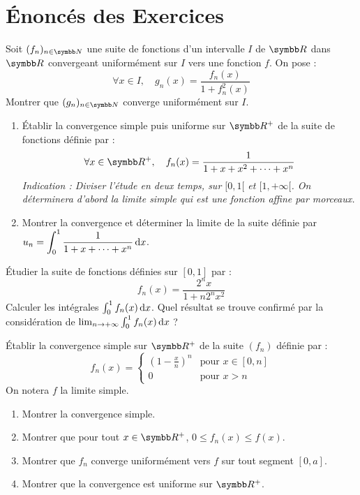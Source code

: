 

\section{Énoncés des Exercices}

\begin{exercice}
Soit $(f_n)_{n\in\N}$ une suite de fonctions d'un intervalle $I$ de $\R$ dans $\R$ convergeant uniformément sur $I$ vers une fonction $f$.
On pose :
$$ \forall x \in I, \quad g_n(x) = \frac{f_n(x)}{1+f_n^2(x)} $$
Montrer que $(g_n)_{n\in\N}$ converge uniformément sur $I$.
\end{exercice}

\begin{exercice}
\begin{enumerate}
    \item Établir la convergence simple puis uniforme sur $\R^+$ de la suite de fonctions définie par :
    \[\forall x \in \R^+, \quad f_n(x) = \frac{1}{1+x+x^2+\dots+x^n}\]
    \textit{Indication : Diviser l'étude en deux temps, sur $[0, 1[$ et $[1, +\infty[$. On déterminera d'abord la limite simple qui est une fonction affine par morceaux.}

    \item Montrer la convergence et déterminer la limite de la suite définie par $\displaystyle u_n = \int_0^1 \frac{1}{1+x+\dots+x^n} \,\mathrm{d}x$. 
\end{enumerate}
\end{exercice}

\begin{exercice}
Étudier la suite de fonctions définies sur $[0, 1]$ par :
$$ f_n(x) = \frac{2^n x}{1+n 2^n x^2} $$
Calculer les intégrales $\int_0^1 f_n(x) \,\mathrm{d}x$. Quel résultat se trouve confirmé par la considération de $\lim_{n\to+\infty} \int_0^1 f_n(x) \,\mathrm{d}x$ ?
\end{exercice}

\begin{exercice}
Établir la convergence simple sur $\R^+$ de la suite $(f_n)$ définie par :
\[f_n(x) = \begin{cases} (1-\frac{x}{n})^n & \text{pour } x \in [0, n] \\ 0 & \text{pour } x > n \end{cases}\]
On notera $f$ la limite simple.
\begin{enumerate}
    \item Montrer la convergence simple.
    \item Montrer que pour tout $x \in \R^+$, $0 \leqslant f_n(x) \leqslant f(x)$.
    \item Montrer que $f_n$ converge uniformément vers $f$ sur tout segment $[0, a]$.
    \item Montrer que la convergence est uniforme sur $\R^+$.
\end{enumerate}
\end{exercice}

